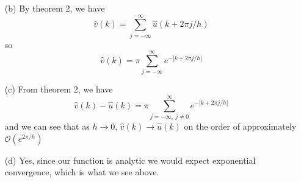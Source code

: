 \documentclass{article}
\begin{document}
\begin{itemize}
    


    \item[(b)] By theorem 2, we have
    \[\hat{v}(k) = \sum_{j = -\infty}^{\infty} \hat{u}(k + 2\pi j/h)\]
    so
    \[\hat{v}(k) = \pi\sum_{j = -\infty}^{\infty} e^{-|k + 2\pi j/h|}\]
    


    \item[(c)] From theorem 2, we have
    \[\hat{v}(k) - \hat{u}(k) = \pi\sum_{j=-\infty, \: j \neq 0}^{\infty} e^{-|k + 2\pi j/h|}\]
    and we can see that as $h \to 0$, $\hat{v}(k) \to \hat{u}(k)$ on the order of approximately $\mathcal{O}(e^{2 \pi/h})$
    \item[(d)] Yes, since our function is analytic we would expect exponential convergence, which is what we see above.


    
    

\end{itemize}
\end{document}
